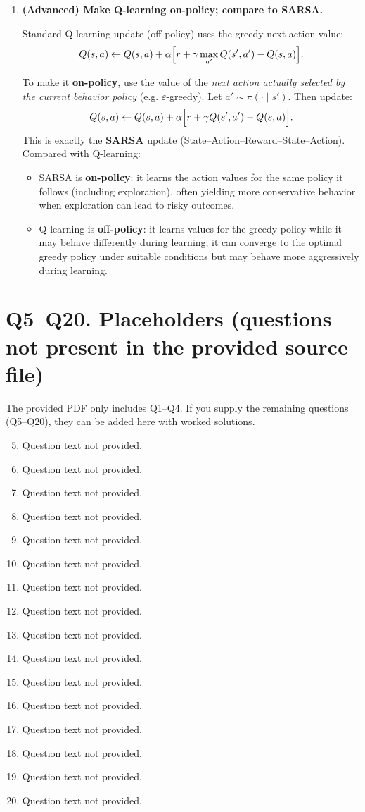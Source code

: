 \documentclass[11pt]{article}
\begin{document}
\begin{enumerate}[label=(\alph*)]
\item \textbf{(Advanced) Make Q-learning on-policy; compare to SARSA.}

Standard Q-learning update (off-policy) uses the greedy next-action value:
\[
Q(s,a)\leftarrow Q(s,a)+\alpha\Bigl[r+\gamma\max_{a'}Q(s',a')-Q(s,a)\Bigr].
\]

To make it \textbf{on-policy}, use the value of the \emph{next action actually selected by the current behavior policy} (e.g. $\varepsilon$-greedy). Let $a'\sim \pi(\cdot\mid s')$. Then update:
\[
Q(s,a)\leftarrow Q(s,a)+\alpha\Bigl[r+\gamma Q(s',a')-Q(s,a)\Bigr].
\]
This is exactly the \textbf{SARSA} update (State--Action--Reward--State--Action). Compared with Q-learning:
\begin{itemize}
\item SARSA is \textbf{on-policy}: it learns the action values for the same policy it follows (including exploration), often yielding more conservative behavior when exploration can lead to risky outcomes.
\item Q-learning is \textbf{off-policy}: it learns values for the greedy policy while it may behave differently during learning; it can converge to the optimal greedy policy under suitable conditions but may behave more aggressively during learning.
\end{itemize}

\end{enumerate}

\section*{Q5--Q20. Placeholders (questions not present in the provided source file)}

\noindent The provided PDF only includes Q1--Q4. If you supply the remaining questions (Q5--Q20), they can be added here with worked solutions.

\begin{enumerate}[label=\textbf{Q\arabic*:}, leftmargin=*]
\setcounter{enumi}{4}
\item Question text not provided.
\item Question text not provided.
\item Question text not provided.
\item Question text not provided.
\item Question text not provided.
\item Question text not provided.
\item Question text not provided.
\item Question text not provided.
\item Question text not provided.
\item Question text not provided.
\item Question text not provided.
\item Question text not provided.
\item Question text not provided.
\item Question text not provided.
\item Question text not provided.
\item Question text not provided.
\end{enumerate}
\end{document}
